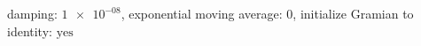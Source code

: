 damping: $\num[scientific-notation=true]{1e-08}$, exponential moving average: $\num[scientific-notation=false]{0}$, initialize Gramian to identity: $\text{yes}$